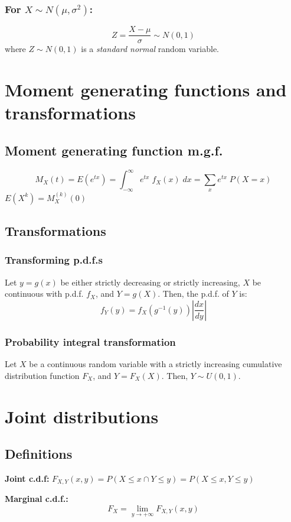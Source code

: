\documentclass[15pt]{article}
\begin{document}
\subsubsection{For $X \sim N(\mu, \sigma^2)$:}
\[
    Z = \frac{X - \mu}{\sigma} \sim N(0,1)
\]
where $Z \sim N(0,1)$ is a \emph{standard normal} random variable.

\section{Moment generating functions and transformations}
\subsection{Moment generating function m.g.f.}
\[
    M_X (t) = E(e^{tx}) = \int_{-\infty}^{\infty}  e^{tx} \; f_X (x) \; dx = \sum_x e^{tx} \; P(X = x)
\]
$E(X^k) = M_X^{(k)} (0)$

\subsection{Transformations}
\subsubsection{Transforming p.d.f.s}
Let $y = g(x)$ be either strictly decreasing or strictly increasing, $X$ be continuous with p.d.f. $f_X$, and $Y = g(X)$. Then, the p.d.f. of $Y$ is:
\[
    f_Y (y) = f_X (g^{-1} (y)) \left|\frac{dx}{dy}\right|
\]

\subsubsection{Probability integral transformation}
Let $X$ be a continuous random variable with a strictly increasing cumulative distribution function $F_X$, and $Y = F_X (X)$. Then, $Y \sim U(0,1)$.

\section{Joint distributions}
\subsection{Definitions}
\textbf{Joint c.d.f:} $F_{X,Y} (x,y) = P(X \leq x \cap Y \leq y) = P(X \leq x, Y \leq y)$

\textbf{Marginal c.d.f.:} 
\[
	F_X = \lim_{y \to + \infty} F_{X,Y} (x,y)
\]
\end{document}

